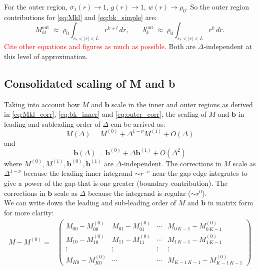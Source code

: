 \documentclass[11pt,a4paper]{article}
\theoremstyle{remark}
\newcommand{\bvec}{\mathbf{b}}
\def\sgp#1{{\sf\textcolor{red}{#1}}}
\begin{document}
\begin{onehalfspace}
For the outer region, $\sigma_1(r) \to 1$, $g(r) \to 1$, $w(r) \to \rho_0$. So the outer region contributions for \eqref{eq:Mkl} and \eqref{eq:bk_simple} are:
\begin{equation}
M_{kl}^{\text{out}} \;\approx\; \rho_0 \int_{r_* < |r| < L} r^{k+l}\, dr, \qquad b_k^{\text{out}} \;\approx\; \rho_0 \int_{r_* < |r| < L} r^k\, dr.
\label{eq:outer_corr}
\end{equation}
\sgp{Cite other equations and figures as much as possible.} Both are $\Delta$-independent at this level of approximation.

\subsection{Consolidated scaling of M and b}
Taking into account how $M$ and $\bvec$ scale in the inner and outer regions as derived in \eqref{eq:Mkl_corr}, \eqref{eq:bk_inner} and \eqref{eq:outer_corr}, the scaling of $M$ and $\bvec$ in leading and subleading order of $\Delta$ can be arrived as:
\begin{equation}
    M(\Delta) = M^{(0)} + \Delta^{1-\nu}M^{(1)} + O(\Delta)
    \label{eq:M_expansion}
\end{equation}
and 
\begin{equation}
    \bvec(\Delta) = \bvec^{(0)} + \Delta \bvec^{(1)} + O(\Delta^2)
    \label{eq:b_expansion}
\end{equation}
where $M^{(0)}, M^{(1)}, \mathbf{b}^{(0)}, \mathbf{b}^{(1)}$ are $\Delta$-independent. The corrections in $M$ scale as $\Delta^{1-\nu}$ because the leading inner integrand $\sim r^{-\nu}$ near the gap edge integrates to give a power of the gap that is one greater (boundary contribution). The corrections in $\mathbf{b}$ scale as $\Delta$ because the integrand is regular ($\sim r^0$).\\
We can write down the leading and sub-leading order of $M$ and $\bvec$ in matrix form for more clarity:
\smallskip
\begin{align}
    M-M^{(0)} =& \begin{pmatrix}
            M_{00} - M^{(0)}_{00} & M_{01}-M^{(0)}_{01} & \cdots & M_{0\,K-1}- M^{(0)}_{0\,K-1} \\
            M_{10} - M^{(0)}_{10} & M_{11}- M^{(0)}_{11} & \cdots & M_{1\,K-1} - M^{(0)}_{1\,K-1} \\
            \vdots & \vdots & \vdots & \vdots \\
            M_{K0}-M^{(0)}_{K0} & \cdots & \cdots & M_{K-1\,K-1} - M^{(0)}_{K-1\,K-1}
    \end{pmatrix} \nonumber \\ \nonumber \\

\end{align}
\end{onehalfspace}
\end{document}
